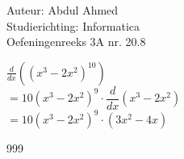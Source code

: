 \documentclass[a4paper]{article}
\begin{document}
	
\noindent \large Auteur: Abdul Ahmed \\
\noindent \large Studierichting: Informatica\\
\noindent \large Oefeningenreeks 3A nr. 20.8\\
	
\medskip
	
\normalsize
	
$\frac{d}{dx}\left(( x^3 - 2x^2)^{10} \right)$\\
	
$= 10 \left( x^3 - 2x^2 \right)^{9} \cdot \dfrac{d}{dx} \left( x^3 - 2x^2 \right)$\\
	
$=10 \left( x^3 - 2x^2 \right)^{9} \cdot \left( 3x^2 - 4x \right)$\\
	
\begin{thebibliography}{999}
\end{thebibliography}
\end{document}
